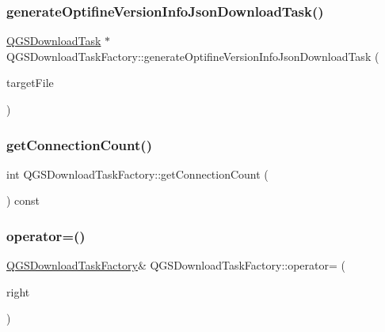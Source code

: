 \subsubsection{\texorpdfstring{generate\+Optifine\+Version\+Info\+Json\+Download\+Task()}{generateOptifineVersionInfoJsonDownloadTask()}}
{\footnotesize\ttfamily \mbox{\hyperlink{class_q_g_s_download_task}{Q\+G\+S\+Download\+Task}} $\ast$ Q\+G\+S\+Download\+Task\+Factory\+::generate\+Optifine\+Version\+Info\+Json\+Download\+Task (\begin{DoxyParamCaption}\item[{Q\+File $\ast$}]{target\+File }\end{DoxyParamCaption})}

\mbox{\label{class_q_g_s_download_task_factory_a1e9feb18ce144e6aa2571cecb5ac1cd3}} 
\subsubsection{\texorpdfstring{get\+Connection\+Count()}{getConnectionCount()}}
{\footnotesize\ttfamily int Q\+G\+S\+Download\+Task\+Factory\+::get\+Connection\+Count (\begin{DoxyParamCaption}{ }\end{DoxyParamCaption}) const}

\mbox{\label{class_q_g_s_download_task_factory_aed201012c4a05735f2244f8688ca1926}} 
\subsubsection{\texorpdfstring{operator=()}{operator=()}\hspace{0.1cm}{\footnotesize\ttfamily [1/2]}}
{\footnotesize\ttfamily \mbox{\hyperlink{class_q_g_s_download_task_factory}{Q\+G\+S\+Download\+Task\+Factory}}\& Q\+G\+S\+Download\+Task\+Factory\+::operator= (\begin{DoxyParamCaption}\item[{const \mbox{\hyperlink{class_q_g_s_download_task_factory}{Q\+G\+S\+Download\+Task\+Factory}} \&}]{right }\end{DoxyParamCaption})\hspace{0.3cm}{\ttfamily [delete]}}


